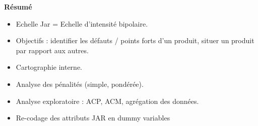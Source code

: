 \documentclass[aspectratio=169,xcolor=dvipsnames]{beamer}
\begin{document}
\begin{frame}
	\begin{block}{\textbf{Résumé}}
		\begin{itemize}
		\item Echelle Jar = Echelle d'intensité bipolaire.
		\item Objectifs : identifier les défauts / points forts d'un produit, situer un produit par rapport aux autres.
		\item Cartographie interne.
		\item Analyse des pénalités (simple, pondérée).
		\item Analyse exploratoire : ACP, ACM, agrégation des données.
		\item Re-codage des attributs JAR en \og dummy variables \fg{} 
		\end{itemize}
	\end{block}
\end{frame}
\end{document}
